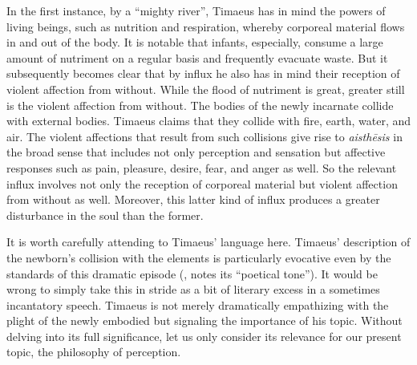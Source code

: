 In the first instance, by a ``mighty river'', Timaeus has in mind the powers of living beings, such as nutrition and respiration, whereby corporeal material flows in and out of the body. It is notable that infants, especially, consume a large amount of nutriment on a regular basis and frequently evacuate waste.  But it subsequently becomes clear that by influx he also has in mind their reception of violent affection from without. While the flood of nutriment is great, greater still is the violent affection from without. The bodies of the newly incarnate collide with external bodies. Timaeus claims that they collide with fire, earth, water, and air. The violent affections that result from such collisions give rise to \emph{aisthēsis} in the broad sense that includes not only perception and sensation but affective responses such as pain, pleasure, desire, fear, and anger as well. So the relevant influx involves not only the reception of corporeal material but violent affection from without as well. Moreover, this latter kind of influx produces a greater disturbance in the soul than the former.

It is worth carefully attending to Timaeus' language here. Timaeus' description of the newborn's collision with the elements is particularly evocative even by the standards of this dramatic episode (\citealt[149 n10]{Archer-Hind:1888qd}, notes its ``poetical tone''). It would be wrong to simply take this in stride as a bit of literary excess in a sometimes incantatory speech. Timaeus is not merely dramatically empathizing with the plight of the newly embodied but signaling the importance of his topic. Without delving into its full significance, let us only consider its relevance for our present topic, the philosophy of perception. 

